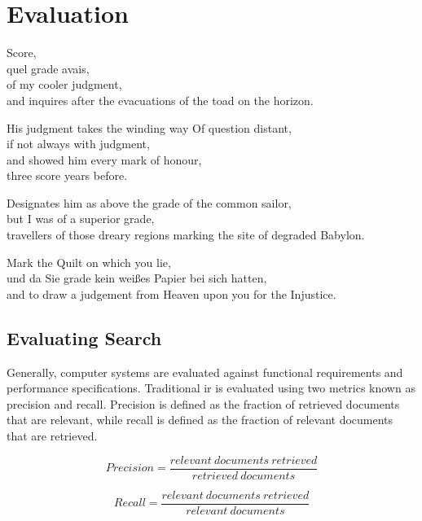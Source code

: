 
\chapter{Evaluation}
\label{ch:evaluation}

\startcontents[chapters]

\vfill

Score, \\
quel grade avais, \\
of my cooler judgment, \\
and inquires after the evacuations of the toad on the horizon.

His judgment takes the winding way Of question distant, \\
if not always with judgment, \\
and showed him every mark of honour, \\
three score years before.

Designates him as above the grade of the common sailor, \\
but I was of a superior grade, \\
travellers of those dreary regions marking the site of degraded Babylon.

Mark the Quilt on which you lie, \\
und da Sie grade kein weißes Papier bei sich hatten, \\
and to draw a judgement from Heaven upon you for the Injustice.

\newpage
\minicontents
\spirals

\section{Evaluating Search}

Generally, computer systems are evaluated against functional requirements and performance specifications. Traditional \gls{ir} is evaluated using two metrics known as precision and recall. Precision is defined as the fraction of retrieved documents that are relevant, while recall is defined as the fraction of relevant documents that are retrieved.

\begin{equation}
  Precision = \frac{relevant \ documents \ retrieved}{retrieved \ documents}
  \label{eq:precision}
\end{equation}

\begin{equation}
  Recall = \frac{relevant \ documents \ retrieved}{relevant \ documents}
\label{eq:recall}
\end{equation}

